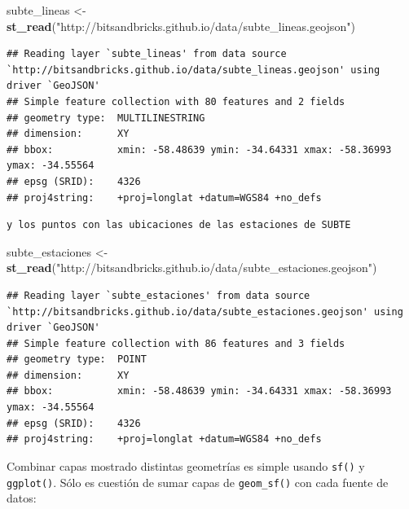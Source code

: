 \documentclass[spanish,]{book}
\newenvironment{Shaded}{\begin{snugshade}}{\end{snugshade}}
\newcommand{\KeywordTok}[1]{\textcolor[rgb]{0.13,0.29,0.53}{\textbf{#1}}}
\newcommand{\NormalTok}[1]{#1}
\newcommand{\StringTok}[1]{\textcolor[rgb]{0.31,0.60,0.02}{#1}}
\begin{document}
\begin{Shaded}
\begin{Highlighting}[]
\NormalTok{subte_lineas <-}\StringTok{ }\KeywordTok{st_read}\NormalTok{(}\StringTok{"http://bitsandbricks.github.io/data/subte_lineas.geojson"}\NormalTok{)}
\end{Highlighting}
\end{Shaded}

\begin{verbatim}
## Reading layer `subte_lineas' from data source `http://bitsandbricks.github.io/data/subte_lineas.geojson' using driver `GeoJSON'
## Simple feature collection with 80 features and 2 fields
## geometry type:  MULTILINESTRING
## dimension:      XY
## bbox:           xmin: -58.48639 ymin: -34.64331 xmax: -58.36993 ymax: -34.55564
## epsg (SRID):    4326
## proj4string:    +proj=longlat +datum=WGS84 +no_defs
\end{verbatim}

\begin{verbatim}
y los puntos con las ubicaciones de las estaciones de SUBTE
\end{verbatim}

\begin{Shaded}
\begin{Highlighting}[]
\NormalTok{subte_estaciones <-}\StringTok{ }\KeywordTok{st_read}\NormalTok{(}\StringTok{"http://bitsandbricks.github.io/data/subte_estaciones.geojson"}\NormalTok{)}
\end{Highlighting}
\end{Shaded}

\begin{verbatim}
## Reading layer `subte_estaciones' from data source `http://bitsandbricks.github.io/data/subte_estaciones.geojson' using driver `GeoJSON'
## Simple feature collection with 86 features and 3 fields
## geometry type:  POINT
## dimension:      XY
## bbox:           xmin: -58.48639 ymin: -34.64331 xmax: -58.36993 ymax: -34.55564
## epsg (SRID):    4326
## proj4string:    +proj=longlat +datum=WGS84 +no_defs
\end{verbatim}

Combinar capas mostrado distintas geometrías es simple usando \texttt{sf()} y \texttt{ggplot()}. Sólo es cuestión de sumar capas de \texttt{geom\_sf()} con cada fuente de datos:
\end{document}

